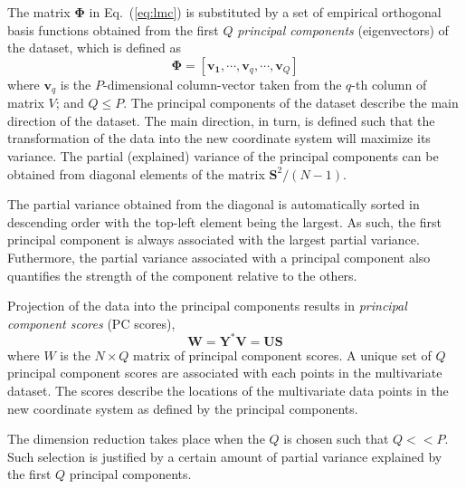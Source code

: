 The matrix $\boldsymbol{\Phi}$ in Eq.~(\ref{eq:lmc}) is substituted by a set of empirical orthogonal basis functions obtained from the first $Q$ \emph{principal components} (eigenvectors) of the dataset, which is defined as
\begin{equation}
	\boldsymbol{\Phi} = [\mathbf{v_1}, \cdots, \mathbf{v}_q, \cdots, \mathbf{v}_Q]
\label{eq:pc_direction}
\end{equation}
where $\mathbf{v}_q$ is the $P$-dimensional column-vector taken from the $q$-th column of matrix $V$;
and $Q \leq P$.
The principal components of the dataset describe the main direction of the dataset.
The main direction, in turn, is defined such that the transformation of the data into the new coordinate system will maximize its variance.
The partial (explained) variance of the principal components can be obtained from diagonal elements of the matrix $\mathbf{S}^2/(N-1)$.

The partial variance obtained from the diagonal is automatically sorted in descending order with the top-left element being the largest.
As such, the first principal component is always associated with the largest partial variance.
Futhermore, the partial variance associated with a principal component also quantifies the strength of the component relative to the others.

Projection of the data into the principal components results in \emph{principal component scores} (PC scores),
\begin{equation}
	\mathbf{W} = \mathbf{Y}^* \mathbf{V} = \mathbf{U} \mathbf{S}
\label{eq:pc_scores}
\end{equation}
where $W$ is the $N \times Q$ matrix of principal component scores.
A unique set of $Q$ principal component scores are associated with each points in the multivariate dataset.
The scores describe the locations of the multivariate data points in the new coordinate system as defined by the principal components.


The dimension reduction takes place when the $Q$ is chosen such that $Q << P$.
Such selection is justified by a certain amount of partial variance explained by the first $Q$ principal components.



